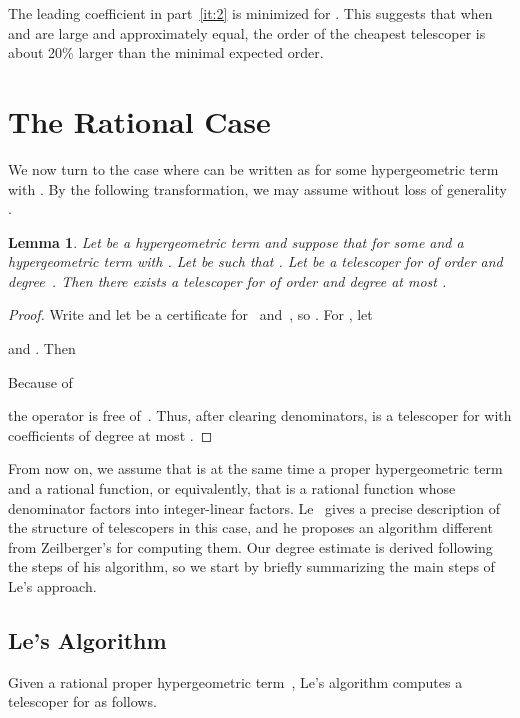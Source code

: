\documentclass{sig-alternate}
\newtheorem{lemma}[theorem]{Lemma}
\begin{document}
The leading coefficient in part~\ref{it:2} is minimized for . This suggests that
when  and  are large and approximately equal, the order of the cheapest telescoper
is about 20\% larger than the minimal expected order.

\section{The Rational Case}\label{sec:rat}

We now turn to the case where  can be written as  for some hypergeometric term 
with . By the following transformation, we may assume without loss of generality .

\begin{lemma}
  Let  be a hypergeometric term and suppose that  for some  and a hypergeometric
  term  with . Let  be such that .
  Let  be a telescoper for  of order  and degree~.
  Then there exists a telescoper for  of order  and degree at most
  .
\end{lemma}
\begin{proof}
  Write  and let  be a certificate
  for~ and~, so . For , let
  
  and . Then
  
  Because of
  
  the operator  is free of~. Thus, after clearing denominators,  is
  a telescoper for  with coefficients of degree at most .
\end{proof}

{}From now on, we assume that  is at the same time a proper hypergeometric term and a rational
function, or equivalently, that  is a rational function whose denominator factors into integer-linear
factors. Le~\cite{le03} gives a precise description of the structure of telescopers in this case, and he
proposes an algorithm different from Zeilberger's for computing them. Our degree estimate is derived
following the steps of his algorithm, so we start by briefly summarizing the main steps of Le's approach.

\subsection{Le's Algorithm}\label{sec:le}

Given a rational proper hypergeometric term~, Le's algorithm computes a telescoper  for  as follows.
\end{document}
